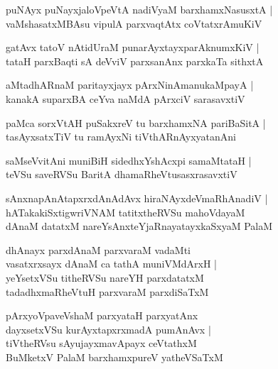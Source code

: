 \begin{shloka}
puNAyx puNayxjaloVpeVtA nadiVyaM barxhamxNasusxtA |\\
vaMshasatxMBAsu vipulA parxvaqtAtx coVtatxrAmuKiV
\end{shloka}

\begin{shloka}
gatAvx tatoV nAtidUraM punarAyxtayxparAknumxKiV |\\
tataH parxBaqti sA deVviV parxsanAnx parxkaTa sithxtA 
\end{shloka}

\begin{shloka}
aMtadhARnaM paritayxjayx pArxNinAmanukaMpayA |\\
kanakA suparxBA ceYva naMdA pArxciV sarasavxtiV
\end{shloka}

\begin{shloka}
paMca sorxVtAH puSakxreV tu barxhamxNA pariBaSitA |\\
tasAyxsatxTiV tu ramAyxNi tiVthARnAyxyatanAni
\end{shloka}

\begin{shloka}
saMseVvitAni muniBiH sidedhxYshAcxpi samaMtataH |\\
teVSu saveRVSu BaritA dhamaRheVtusasxrasavxtiV 
\end{shloka}

\begin{shloka}
sAnxnapAnAtapxrxdAnAdAvx hiraNAyxdeVmaRhAnadiV |\\
hATakakiSxtigwriVNAM tatitxtheRVSu mahoVdayaM\\
dAnaM datatxM nareYsAnxteYjaRnayatayxkaSxyaM PalaM 
\end{shloka}

\begin{shloka}
dhAnayx parxdAnaM parxvaraM vadaMti\\
vasatxrxsayx dAnaM ca tathA muniVMdArxH |\\
yeYsetxVSu titheRVSu nareYH parxdatatxM\\
tadadhxmaRheVtuH parxvaraM parxdiSaTxM
\end{shloka}

\begin{shloka}
pArxyoVpaveVshaM parxyataH parxyatAnx\\
dayxsetxVSu kurAyxtapxrxmadA pumAnAvx |\\
tiVtheRVsu sAyujayxmavApayx ceVtathxM\\
BuMketxV PalaM barxhamxpureV yatheVSaTxM
\end{shloka}

